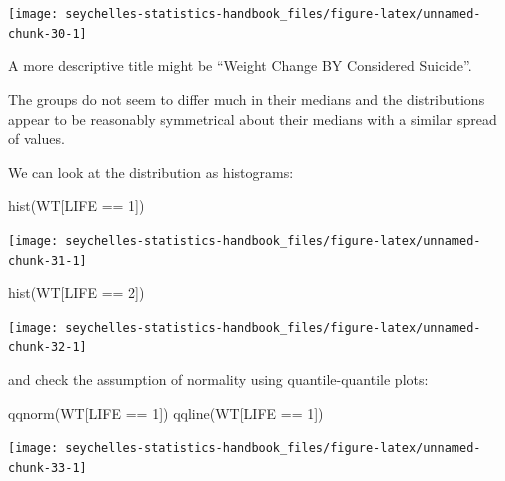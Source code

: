 \documentclass[
  12pt,
]{book}
\newenvironment{Shaded}{\begin{snugshade}}{\end{snugshade}}
\newcommand{\DecValTok}[1]{\textcolor[rgb]{0.00,0.00,0.81}{#1}}
\newcommand{\FunctionTok}[1]{\textcolor[rgb]{0.00,0.00,0.00}{#1}}
\newcommand{\NormalTok}[1]{#1}
\newcommand{\SpecialCharTok}[1]{\textcolor[rgb]{0.00,0.00,0.00}{#1}}
\begin{document}
\begin{center}\texttt{[image: seychelles-statistics-handbook\_files/figure-latex/unnamed-chunk-30-1]} \end{center}

A more descriptive title might be ``Weight Change BY Considered Suicide''.

The groups do not seem to differ much in their medians and the distributions appear to be reasonably symmetrical about their medians with a similar spread of values.

\newpage

We can look at the distribution as histograms:

\begin{Shaded}
\begin{Highlighting}[]
\FunctionTok{hist}\NormalTok{(WT[LIFE }\SpecialCharTok{==} \DecValTok{1}\NormalTok{])}
\end{Highlighting}
\end{Shaded}

\begin{center}\texttt{[image: seychelles-statistics-handbook\_files/figure-latex/unnamed-chunk-31-1]} \end{center}

\begin{Shaded}
\begin{Highlighting}[]
\FunctionTok{hist}\NormalTok{(WT[LIFE }\SpecialCharTok{==} \DecValTok{2}\NormalTok{])}
\end{Highlighting}
\end{Shaded}

\begin{center}\texttt{[image: seychelles-statistics-handbook\_files/figure-latex/unnamed-chunk-32-1]} \end{center}

\newpage

and check the assumption of normality using quantile-quantile plots:

\begin{Shaded}
\begin{Highlighting}[]
\FunctionTok{qqnorm}\NormalTok{(WT[LIFE }\SpecialCharTok{==} \DecValTok{1}\NormalTok{])}
\FunctionTok{qqline}\NormalTok{(WT[LIFE }\SpecialCharTok{==} \DecValTok{1}\NormalTok{])}
\end{Highlighting}
\end{Shaded}

\begin{center}\texttt{[image: seychelles-statistics-handbook\_files/figure-latex/unnamed-chunk-33-1]} \end{center}
\end{document}
